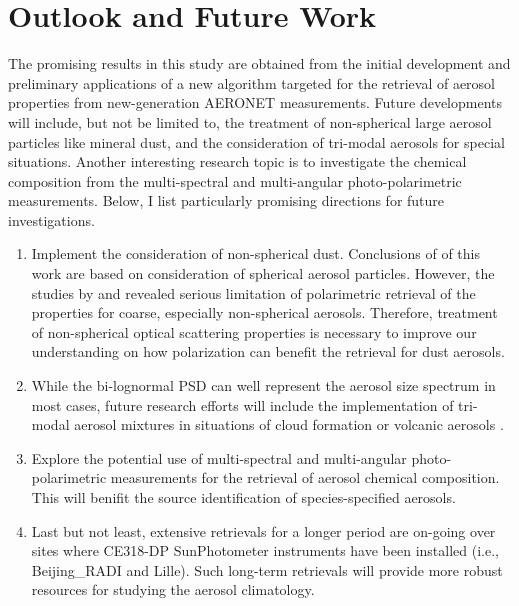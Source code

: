 \section{Outlook and Future Work}

The promising results in this study are obtained from the initial development
and preliminary applications of a new algorithm targeted for the retrieval of
aerosol properties from new-generation AERONET measurements. Future
developments will include, but not be limited to, the treatment of
non-spherical large aerosol particles like mineral dust, and the consideration
of tri-modal aerosols for special situations. Another interesting research 
topic is to investigate the chemical composition from the multi-spectral and
multi-angular photo-polarimetric measurements. Below, I list particularly
promising directions for future investigations.

\begin{enumerate}
\item Implement the consideration of non-spherical dust. Conclusions of
of this work are based on consideration of spherical aerosol particles.
However, the studies by \citet{Dubovik06} and \citet{Deuze93, Deuze01}
revealed serious limitation of polarimetric retrieval
of the properties for coarse, especially non-spherical aerosols.
Therefore, treatment of non-spherical optical scattering properties is
necessary to improve our understanding on how polarization can benefit
the retrieval for dust aerosols.  
\item While the bi-lognormal PSD can well represent the aerosol size spectrum 
in most cases, future research efforts  will include the implementation of 
tri-modal aerosol mixtures in situations of cloud formation \citep{Eck12} 
or volcanic aerosols \citep{Eck10}.
\item Explore the potential use of multi-spectral and multi-angular 
photo-polarimetric measurements for the retrieval of aerosol chemical 
composition. This will benifit the source identification of species-specified
aerosols.
\item Last but not least, extensive retrievals for a longer period are
on-going over sites where CE318-DP SunPhotometer instruments 
have been installed (i.e., Beijing\_RADI and Lille). Such long-term
retrievals will provide more robust resources for studying the aerosol 
climatology. 
\end{enumerate}


